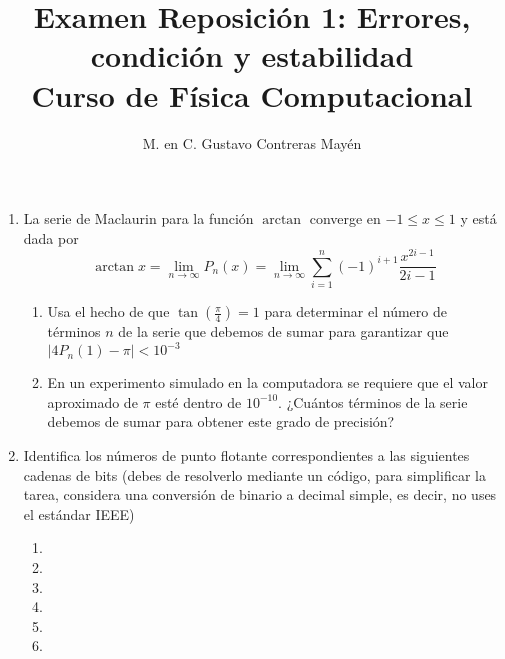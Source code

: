 \documentclass[11pt]{article}
\title{Examen Reposición 1: Errores, condición y estabilidad \\ Curso de Física Computacional}
\author{M. en C. Gustavo Contreras Mayén}
\date{ }
\begin{document}
\maketitle
\fontsize{14}{14}\selectfont
\begin{enumerate}
\item La serie de Maclaurin para la función $\arctan$ converge en $-1 \leq x \leq 1$ y está dada por
\[ \arctan x = \lim_{n \rightarrow \infty} P_{n} (x) = \lim_{n \rightarrow \infty} \sum_{i=1}^{n} (-1)^{i+1} \dfrac{x^{2i-1}}{2i-1}	\]
\begin{enumerate}
\item Usa el hecho de que $\tan (\frac{\pi}{4})=1$ para determinar el número de términos $n$ de la serie que debemos de sumar para garantizar que $\vert 4 P_{n}(1) - \pi \vert < 10^{-3}$
\item En un experimento simulado en la computadora se requiere que el valor aproximado de $\pi$ esté dentro de $10^{-10}$. ¿Cuántos términos de la serie debemos de sumar para obtener este grado de precisión?
\end{enumerate}
\item Identifica los números de punto flotante correspondientes a las siguientes cadenas de bits (debes de resolverlo mediante un código, para simplificar la tarea, considera una conversión de binario a decimal simple, es decir, no uses el estándar IEEE)
\begin{enumerate}
\item {}
\item {}
\item {}
\item {}
\item {}
\item {}

\end{enumerate}
\end{enumerate}
\end{document}
